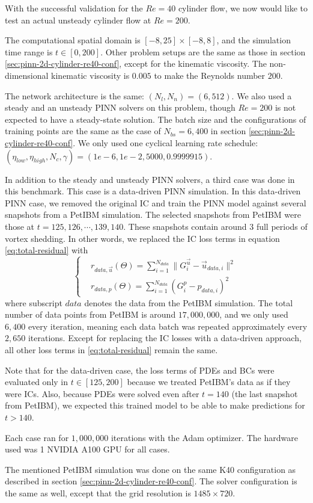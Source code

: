 With the successful validation for the $Re=40$ cylinder flow, we now would like to test an actual unsteady cylinder flow at $Re=200$.

The computational spatial domain is $[-8, 25]\times[-8, 8]$, and the simulation time range is $t\in[0, 200]$.
Other problem setups are the same as those in section \ref{sec:pinn-2d-cylinder-re40-conf}, except for the kinematic viscosity.
The non-dimensional kinematic viscosity is $0.005$ to make the Reynolds number $200$.

The network architecture is the same: $(N_l, N_n)=(6, 512)$.
We also used a steady and an unsteady PINN solvers on this problem, though $Re=200$ is not expected to have a steady-state solution.
The batch size and the configurations of training points are the same as the case of $N_{bs}=6,400$ in section \ref{sec:pinn-2d-cylinder-re40-conf}.
We only used one cyclical learning rate schedule: $(\eta_{low}, \eta_{high}, N_c, \gamma)=(1e-6, 1e-2, 5000, 0.9999915)$.

In addition to the steady and unsteady PINN solvers, a third case was done in this benchmark.
This case is a data-driven PINN simulation.
In this data-driven PINN case, we removed the original IC and train the PINN model against several snapshots from a PetIBM simulation.
The selected snapshots from PetIBM were those at $t=125,126,\cdots,139, 140$.
These snapshots contain around $3$ full periods of vortex shedding.
In other words, we replaced the IC loss terms in equation \eqref{eq:total-residual} with  
\begin{equation}\label{eq:data-driven-loss}
    \left\{
        \begin{aligned}
            &r_{data,\vec{u}}(\Theta) = \sum\limits_{i=1}^{N_{data}}\lVert G_i^{\vec{u}} - \vec{u}_{data, i}\rVert^2 \\
            &r_{data,p}(\Theta) = \sum\limits_{i=1}^{N_{data}}\left( G_i^{p} - p_{data, i} \right)^2
        \end{aligned}
    \right.
\end{equation}
where subscript $data$ denotes the data from the PetIBM simulation.
The total number of data points from PetIBM is around $17,000,000$, and we only used $6,400$ every iteration, meaning each data batch was repeated approximately every $2,650$ iterations.
Except for replacing the IC losses with a data-driven approach, all other loss terms in \eqref{eq:total-residual} remain the same.

Note that for the data-driven case, the loss terms of PDEs and BCs were evaluated only in $t\in[125, 200]$ because we treated PetIBM's data as if they were ICs.
Also, because PDEs were solved even after $t=140$ (the last snapshot from PetIBM), we expected this trained model to be able to make predictions for $t>140$.

Each case ran for $1,000,000$ iterations with the Adam optimizer.
The hardware used was 1 NVIDIA A100 GPU for all cases.

The mentioned PetIBM simulation was done on the same K40 configuration as described in section \ref{sec:pinn-2d-cylinder-re40-conf}.
The solver configuration is the same as well, except that the grid resolution is $1485\times 720$.
